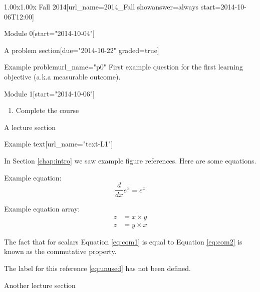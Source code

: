 \documentclass[12pt]{article}
\begin{document}
\begin{edXcourse}{1.00x}{1.00x Fall 2014}[url_name=2014_Fall showanswer=always start=2014-10-06T12:00]
\begin{edXchapter*}{Module 0}[start="2014-10-04"]
\begin{edXsequential}{A problem section}[due="2014-10-22" graded=true]
\begin{edXproblem}{Example problem}{url_name="p0"}
First example question for the first learning objective (a.k.a measurable outcome).

\end{edXproblem}

\end{edXsequential}

\end{edXchapter*}

\begin{edXchapter}{Module 1}[start="2014-10-06"]

\begin{enumerate}
  \item Complete  the course
\end{enumerate}

\begin{edXsequential}{A lecture section}
\label{sec:lecture1}

\begin{edXtext}{Example text}[url_name="text-L1"]
 

In Section \ref{chap:intro} we saw example figure references.  Here are some equations.

Example equation:
\begin{equation}
  \frac{d}{dx} e^x = e^x
  \label{eq:deriv}
\end{equation}

Example equation array:
\begin{eqnarray}
  z & = x \times y \label{eq:com1}\\
  z & = y \times x \label{eq:com2}
\end{eqnarray}

The fact that for scalars Equation \ref{eq:com1} is equal to Equation \ref{eq:com2} is known as the commutative property.

The label for this reference \ref{eq:unused} has not been defined.

\end{edXtext}

\end{edXsequential}

\begin{edXsequential}{Another lecture section}


\end{edXsequential}
\end{edXchapter}
\end{edXcourse}
\end{document}
